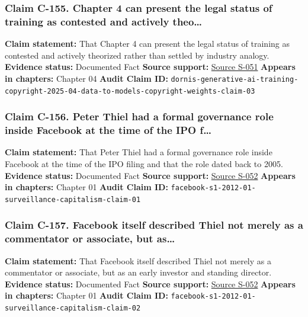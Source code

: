 \documentclass[
  american,
  11pt,
  letterpaper,
]{article}
\begin{document}
\subsubsection{Claim C-155. Chapter 4 can present the legal status of
training as contested and actively
theo\ldots{}}\label{claim-c-155-chapter-4-can-present-the-legal-status-of-training-as-contested-and-actively-theo}

\textbf{Claim statement:} That Chapter 4 can present the legal status of
training as contested and actively theorized rather than settled by
industry analogy. \textbf{Evidence status:} Documented Fact
\textbf{Source support:}
\hyperref[source-s-051-generative-ai-training-and-copyright-law]{Source
S-051} \textbf{Appears in chapters:} Chapter 04 \textbf{Audit Claim ID:}
\texttt{dornis-generative-ai-training-copyright-2025-04-data-to-models-copyright-weights-claim-03}

\subsubsection{Claim C-156. Peter Thiel had a formal governance role
inside Facebook at the time of the IPO
f\ldots{}}\label{claim-c-156-peter-thiel-had-a-formal-governance-role-inside-facebook-at-the-time-of-the-ipo-f}

\textbf{Claim statement:} That Peter Thiel had a formal governance role
inside Facebook at the time of the IPO filing and that the role dated
back to 2005. \textbf{Evidence status:} Documented Fact \textbf{Source
support:}
\hyperref[source-s-052-facebook-inc-registration-statement-on-form-s-1]{Source
S-052} \textbf{Appears in chapters:} Chapter 01 \textbf{Audit Claim ID:}
\texttt{facebook-s1-2012-01-surveillance-capitalism-claim-01}

\subsubsection{Claim C-157. Facebook itself described Thiel not merely
as a commentator or associate, but
as\ldots{}}\label{claim-c-157-facebook-itself-described-thiel-not-merely-as-a-commentator-or-associate-but-as}

\textbf{Claim statement:} That Facebook itself described Thiel not
merely as a commentator or associate, but as an early investor and
standing director. \textbf{Evidence status:} Documented Fact
\textbf{Source support:}
\hyperref[source-s-052-facebook-inc-registration-statement-on-form-s-1]{Source
S-052} \textbf{Appears in chapters:} Chapter 01 \textbf{Audit Claim ID:}
\texttt{facebook-s1-2012-01-surveillance-capitalism-claim-02}
\end{document}
